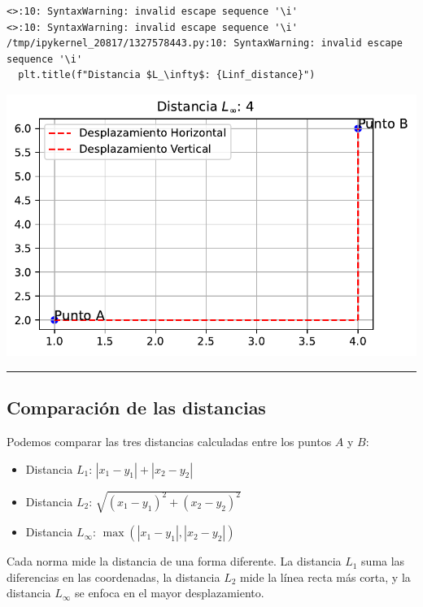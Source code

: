 \documentclass[
  letterpaper,
  DIV=11,
  numbers=noendperiod]{scrartcl}
\providecommand{\tightlist}{%
  \setlength{\itemsep}{0pt}\setlength{\parskip}{0pt}}\usepackage{longtable,booktabs,array}
\begin{document}
\begin{verbatim}
<>:10: SyntaxWarning: invalid escape sequence '\i'
<>:10: SyntaxWarning: invalid escape sequence '\i'
/tmp/ipykernel_20817/1327578443.py:10: SyntaxWarning: invalid escape sequence '\i'
  plt.title(f"Distancia $L_\infty$: {Linf_distance}")
\end{verbatim}

\includegraphics{presentacion_files/figure-pdf/cell-8-output-2.pdf}

\begin{center}\rule{0.5\linewidth}{0.5pt}\end{center}

\subsection{Comparación de las
distancias}\label{comparaciuxf3n-de-las-distancias}

Podemos comparar las tres distancias calculadas entre los puntos \(A\) y
\(B\):

\begin{itemize}
\tightlist
\item
  Distancia \(L_1\): \(|x_1 - y_1| + |x_2 - y_2|\)
\item
  Distancia \(L_2\): \(\sqrt{(x_1 - y_1)^2 + (x_2 - y_2)^2}\)
\item
  Distancia \(L_\infty\): \(\max(|x_1 - y_1|, |x_2 - y_2|)\)
\end{itemize}

Cada norma mide la distancia de una forma diferente. La distancia
\(L_1\) suma las diferencias en las coordenadas, la distancia \(L_2\)
mide la línea recta más corta, y la distancia \(L_\infty\) se enfoca en
el mayor desplazamiento.
\end{document}
